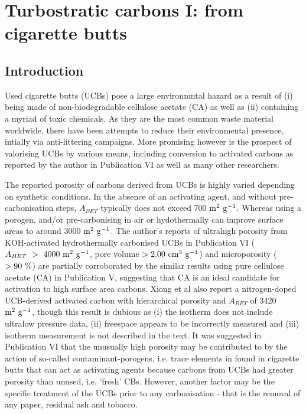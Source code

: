 \chapter{Turbostratic carbons I: from cigarette butts}
\label{ch:cbs}

\newpage

\section{Introduction}

Used cigarette butts (UCBs) pose a large environmntal hazard as a result of (i) being made of non-biodegradable cellulose acetate (CA) as well as (ii) containing a myriad of toxic chemicals.\citep{Slaughter2011, Puls2011, chevalier2018nano} As they are the most common waste material worldwide, there have been attempts to reduce their environmental presence, intially via anti-littering campaigns.\citep{Prevention2011, Harris2011} More promising however is the prospect of valorising UCBs by various means, including conversion to activated carbons as reported by the author in Publication VI as well as many other researchers.\citep{Soltani, Soltani2013, lima2018, xiong2019nitrogen, Lee2014, Hamzah2017, Yu2018, Wang2016a, Koochaki2019, Bilge2019}

The reported porosity of carbons derived from UCBs is highly varied depending on synthetic conditions. In the absence of an activating agent, and without pre-carbonisation steps, $A_{BET}$ typically does not exceed 700 $\rm m^2\ g^{-1}$.\citep{Koochaki2019, Soltani2013, Yazdi2012, Lee2014, Hamzah2017} Whereas using a porogen, and/or pre-carbonising in air or hydothermally can improve surface areas to around 3000 $\rm m^2\ g^{-1}$.\citep{xiong2018, Koochaki2019, Sun2017, Bilge2019} The author's reports of ultrahigh porosity from KOH-activated hydrothermally carbonised UCBs in Publication VI ($A_{BET}\ \rm >\ 4000\ m^2\ g^{-1} $, pore volume $\rm > 2.00\ cm^3\ g^{-1}$) and microporosity ($\rm > 90\ \%$) are partially corroborated by the similar results using pure cellulose acetate (CA) in Publication V, suggesting that CA is an ideal candidate for activation to high surface area carbons. Xiong et al also report a nitrogen-doped UCB-derived activated carbon with hierarchical porosity and $A_{BET}$ of 3420 $\rm m^2\ g^{-1}$, though this result is dubious as (i) the  isotherm does not include ultralow pressure data, (ii) freespace appears to be incorrectly measured and (iii) isotherm measurement is not described in the text.\citep{xiong2019nitrogen} It was suggested in Publication VI that the unusually high porosity may be contributed to by the action of so-called contaminant-porogens, i.e. trace elements in found in cigarette butts that can act as activating agents because carbons from UCBs had greater porosity than unused, i.e. 'fresh' CBs. However, another factor may be the specific treatment of the UCBs prior to any carbonisation - that is the removal of any paper, residual ash and tobacco.

